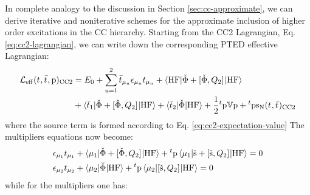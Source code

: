 In complete analogy to the discussion in Section
\ref{sec:cc-approximate}, we can derive iterative and noniterative
schemes for the approximate inclusion of higher order excitations in the
\acrshort*{CC} hierarchy.
Starting from the \acrshort{CC2} Lagrangian, Eq.
\eqref{eq:cc2-lagrangian}, we can write down the corresponding
\acrshort{PTED} effective Lagrangian:\autocite{Sneskov2011-jm,
Schwabe2012-cf}
\begin{equation}\label{eq:pted-cc2-lagrangian}
  \begin{aligned}
  \mathcal{L}_\mathrm{eff}(t_{}, \bar{t}_{}, \mathrm{p})_\mathrm{CC2}
  &=
  E_0
  + \sum_{u=1}^{2}\bar{t}_{\mu_u}\epsilon_{\mu_u}t_{\mu_u}
  + \braket{\mathrm{HF} | \check{\Phi} + [ \check{\Phi}, Q_2 ]^{} | \mathrm{HF}} \\
  &+ \braket{\bar{t}_{1} |
  \check{\Phi} + [ \check{\Phi}, Q_2 ]^{}
  | \mathrm{HF}}
  + \braket{\bar{t}_{2} | \check{\Phi} | \mathrm{HF}}
  + \frac{1}{2}{}^t\mathrm{p}\mathbb{V}\mathrm{p} +
  {}^t\mathrm{p}\mathrm{s}_{\mathrm{N}}(t_{},\bar{t}_{})_\mathrm{CC2}
  \end{aligned}
\end{equation}
where the source term is formed according to Eq.
\eqref{eq:cc2-expectation-value}
The multipliers equations now become:
\begin{subequations}\label{eq:pted-cc2-amplitudes}
  \begin{align}
    \epsilon_{\mu_1}t_{\mu_1} &+
    \braket{\mu_1 | \check{\Phi} +
    [ \check{\Phi}, Q_2 ]^{} | \mathrm{HF}}
    + {}^t\mathrm{p}\braket{\mu_1 | \check{\mathrm{s}} +
    [ \check{\mathrm{s}}, Q_2 ]^{} | \mathrm{HF}}
    = 0
    \label{eq:pted-cc2-singles-amplitudes} \\
    \epsilon_{\mu_2}t_{\mu_2} &+ \braket{\mu_2 | \check{\Phi} | \mathrm{HF}}
    + {}^t\mathrm{p}\braket{\mu_2 | [ \check{\mathrm{s}}, Q_2 ]^{} | \mathrm{HF}}
    = 0
    \label{eq:pted-cc2-doubles-amplitudes}
  \end{align}
\end{subequations}
while for the multipliers one has:
